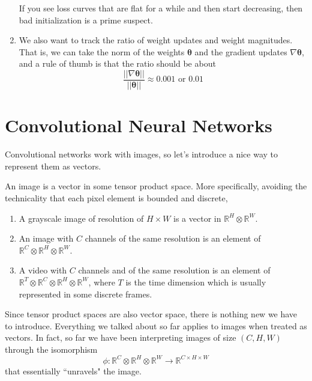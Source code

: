 \documentclass{article}
\begin{document}
\begin{enumerate}
\begin{center}
      \end{center}
      If you see loss curves that are flat for a while and then start decreasing, then bad initialization is a prime suspect. 
      \item We also want to track the ratio of weight updates and weight magnitudes. That is, we can take the norm of the weights $\boldsymbol{\theta}$ and the gradient updates $\nabla \boldsymbol{\theta}$, and a rule of thumb is that the ratio should be about 
      \[\frac{||\nabla \boldsymbol{\theta}||}{||\boldsymbol{\theta}||} \approx 0.001 \text{ or } 0.01\]
    \end{enumerate}

\section{Convolutional Neural Networks}

  Convolutional networks work with images, so let's introduce a nice way to represent them as vectors. 

  \begin{definition} 
    An image is a vector in some tensor product space. More specifically, avoiding the technicality that each pixel element is bounded and discrete,  

    \begin{enumerate}
      \item A grayscale image of resolution of $H \times W$ is a vector in $\mathbb{R}^{H} \otimes \mathbb{R}^{W}$. 

      \item An image with $C$ channels of the same resolution is an element of $\mathbb{R}^{C} \otimes \mathbb{R}^H \otimes \mathbb{R}^W$. 

      \item A video with $C$ channels and of the same resolution is an element of $\mathbb{R}^T \otimes \mathbb{R}^C \otimes \mathbb{R}^H \otimes \mathbb{R}^W$, where $T$ is the time dimension which is usually represented in some discrete frames.
    \end{enumerate}

    Since tensor product spaces are also vector space, there is nothing new we have to introduce. Everything we talked about so far applies to images when treated as vectors. In fact, so far we have been interpreting images of size $(C, H, W)$ through the isomorphism 
    \[\phi: \mathbb{R}^{C} \otimes \mathbb{R}^H \otimes \mathbb{R}^W \rightarrow \mathbb{R}^{C \times H \times W}\]
    that essentially ``unravels" the image. 
  \end{definition}
\end{document}
